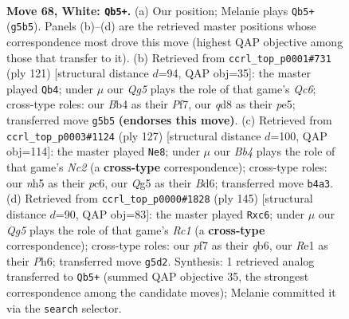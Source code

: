 \documentclass[11pt]{article}
\begin{document}
\clearpage

\begin{figure}[p]\centering
\begin{subfigure}{0.46\textwidth}\centering
\resizebox{\linewidth}{!}{%
\newchessgame
\chessboard[
  setfen={3qk3/5p2/4bn2/6Qn/1Bp4P/p4pP1/P6K/4R3 w - - 4 68},
  showmover=false,
  pgfstyle=straightmove, color=movearrow, markmove={g5-b5}
]}
\caption{}
\end{subfigure}\hfill
\begin{subfigure}{0.46\textwidth}\centering
\resizebox{\linewidth}{!}{%
\newchessgame
\chessboard[
  setfen={6k1/5pp1/3Kp3/2N1P1P1/P7/1Pq2b1P/8/6Q1 b - - 6 61},
  showmover=false,
  pgfstyle=straightmove, color=movearrow, markmove={c3-b4}
]}
\caption{}
\end{subfigure}
\\[4pt]
\begin{subfigure}{0.46\textwidth}\centering
\resizebox{\linewidth}{!}{%
\newchessgame
\chessboard[
  setfen={8/2n3k1/2Pb2p1/1p2p1Pp/1NqpP2P/P2N4/6K1/5Q2 b - - 10 64},
  showmover=false,
  pgfstyle=straightmove, color=movearrow, markmove={c7-e8}
]}
\caption{}
\end{subfigure}\hfill
\begin{subfigure}{0.46\textwidth}\centering
\resizebox{\linewidth}{!}{%
\newchessgame
\chessboard[
  setfen={2r3k1/6p1/1QNqp1Bp/P4p1P/1p6/1P4P1/6PK/8 b - - 0 73},
  showmover=false,
  pgfstyle=straightmove, color=movearrow, markmove={c8-c6}
]}
\caption{}
\end{subfigure}
\caption{\textbf{Move 68, White: \texttt{Qb5+}.} (a) Our position; Melanie plays \texttt{Qb5+} (\texttt{g5b5}). Panels (b)--(d) are the retrieved master positions whose correspondence most drove this move (highest QAP objective among those that transfer to it). (b) Retrieved from \texttt{ccrl\_top\_p0001\#731} (ply 121) [structural distance $d$=94, QAP obj=35]: the master played \texttt{Qb4}; under $\mu$ our \emph{Qg5} plays the role of that game's \emph{Qc6}; cross-type roles: our \emph{B}b4 as their \emph{P}f7, our \emph{q}d8 as their \emph{p}e5; transferred move \texttt{g5b5} \textbf{(endorses this move)}. (c) Retrieved from \texttt{ccrl\_top\_p0003\#1124} (ply 127) [structural distance $d$=100, QAP obj=114]: the master played \texttt{Ne8}; under $\mu$ our \emph{Bb4} plays the role of that game's \emph{Nc2} (a \textbf{cross-type} correspondence); cross-type roles: our \emph{n}h5 as their \emph{p}c6, our \emph{Q}g5 as their \emph{B}d6; transferred move \texttt{b4a3}. (d) Retrieved from \texttt{ccrl\_top\_p0000\#1828} (ply 145) [structural distance $d$=90, QAP obj=83]: the master played \texttt{Rxc6}; under $\mu$ our \emph{Qg5} plays the role of that game's \emph{Rc1} (a \textbf{cross-type} correspondence); cross-type roles: our \emph{p}f7 as their \emph{q}b6, our \emph{R}e1 as their \emph{P}h6; transferred move \texttt{g5d2}. Synthesis: 1 retrieved analog transferred to \texttt{Qb5+} (summed QAP objective 35, the strongest correspondence among the candidate moves); Melanie committed it via the \texttt{search} selector.}
\label{fig:thought-m134}
\end{figure}
\end{document}
